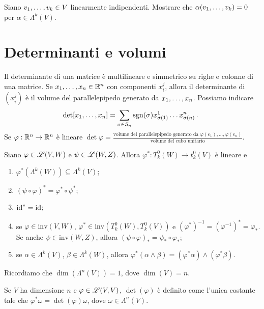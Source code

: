 \begin{exercise}
	Siano $\seqb vk, \in V$ linearmente indipendenti. Mostrare che $\alpha(\seqb vk,) = 0$ per $\alpha\in\Lambda^k(V)$. 
\end{exercise}


\section{Determinanti e volumi}

Il determinante di una matrice è multilineare e simmetrico su righe e colonne di una matrice.
Se $\seqb xn, \in\R^n$ con componenti $x_i^j$, allora il determinante di $(x_i^j)$ è il volume del parallelepipedo generato da $\seqb xn,$.
Possiamo indicare
\begin{equation*}
	\det[\seqb xn,] = \sum_{\sigma\in S_n} \sgn(\sigma) x_{\sigma(1)}^1\ldots x_{\sigma(n)}^n \punto
\end{equation*}
Se $\varphi:\R^n\to\R^n$ è lineare $\det\varphi = \frac{\text{volume del parallelepipedo generato da $\varphi(e_1),\ldots,\varphi(e_n)$}}{\text{volume del cubo unitario}}$.

\begin{proposition}
	Siano $\varphi\in\Lin(V,W)$ e $\psi\in\Lin(W,Z)$. Allora $\varphi^* : T^0_k(W) \to t^0_k(V)$ è lineare e 
	\begin{enumerate}
		\item $\varphi^*(\Lambda^k(W)) \subseteq \Lambda^k(V)$;
		\item $(\psi\circ\varphi)^* = \varphi^* \circ \psi^*$;
		\item $\id^* = \id$;
		\item se $\varphi\in \mathrm{inv}(V,W)$, $\varphi^*\in \mathrm{inv}(T^0_k(W), T^0_k(V))$ e $(\varphi^*)^{-1} = (\varphi^{-1})^* = \varphi_*$.
		Se anche $\psi\in\mathrm{inv}(W,Z)$, allora $(\psi\circ\varphi)_* = \psi_*\circ \varphi_*$; %
		\item se $\alpha\in\Lambda^k(V)$, $\beta\in\Lambda^k(W)$, allora $\varphi^*(\alpha\wedge\beta) = (\varphi^*\alpha) \wedge (\varphi^*\beta)$.
	\end{enumerate}
\end{proposition}

Ricordiamo che $\dim(\Lambda^n(V)) = 1$, dove $\dim(V)=n$.
\begin{definition}
	Se $V$ ha dimensione $n$ e $\varphi\in\Lin(V,V)$, $\det(\varphi)$ è definito come l'unica costante tale che $\varphi^*\omega = \det(\varphi) \omega$, dove $\omega\in\Lambda^n(V)$.
\end{definition}

